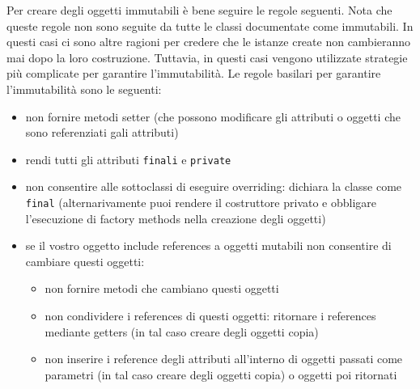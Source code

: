 \documentclass{article}
\begin{document}
Per creare degli oggetti immutabili \`e bene seguire le regole seguenti. Nota che queste regole non sono seguite da tutte le classi documentate come immutabili. In questi casi ci sono altre ragioni per credere  che le istanze create non cambieranno mai dopo la loro costruzione. Tuttavia, in questi casi vengono utilizzate strategie pi\`u complicate per garantire l'immutabilit\`a. Le regole basilari per garantire l'immutabilit\`a sono le seguenti:
\begin{itemize}
\item non fornire metodi setter (che possono modificare gli attributi o oggetti che sono referenziati gali attributi)
\item rendi tutti gli attributi \texttt{finali} e \texttt{private}
\item non consentire alle sottoclassi di eseguire overriding: dichiara la classe come \texttt{final} (alternarivamente puoi rendere il costruttore privato e obbligare l'esecuzione di factory methods nella creazione degli oggetti)
\item se il vostro oggetto include references a oggetti mutabili non consentire di cambiare questi oggetti:
\begin{itemize}
\item non fornire metodi che cambiano questi oggetti
\item non condividere i references di questi oggetti: ritornare i references mediante getters (in tal caso creare degli oggetti copia)
\item non inserire i reference degli attributi all'interno di oggetti passati come parametri (in tal caso creare degli oggetti copia) o oggetti poi ritornati
\end{itemize} 
\end{itemize}  
\end{document}
